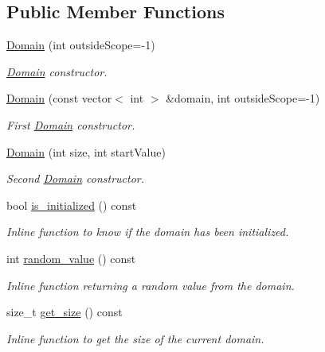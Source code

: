 \subsection*{Public Member Functions}
\begin{DoxyCompactItemize}
\item 
\hyperlink{classghost_1_1Domain_a48bfae90d7dbb6d8e1a3afdd8e471e4f}{Domain} (int outside\-Scope=-\/1)
\begin{DoxyCompactList}\small\item\em \hyperlink{classghost_1_1Domain}{Domain} constructor. \end{DoxyCompactList}\item 
\hyperlink{classghost_1_1Domain_a5277f6bd2940a87b4784834e93cb53c9}{Domain} (const vector$<$ int $>$ \&domain, int outside\-Scope=-\/1)
\begin{DoxyCompactList}\small\item\em First \hyperlink{classghost_1_1Domain}{Domain} constructor. \end{DoxyCompactList}\item 
\hyperlink{classghost_1_1Domain_a6a9f7b0aec78acb0b0f4edefaea7a6e9}{Domain} (int size, int start\-Value)
\begin{DoxyCompactList}\small\item\em Second \hyperlink{classghost_1_1Domain}{Domain} constructor. \end{DoxyCompactList}\item 
bool \hyperlink{classghost_1_1Domain_a3190b9f6968e00831434f8d241991353}{is\-\_\-initialized} () const 
\begin{DoxyCompactList}\small\item\em Inline function to know if the domain has been initialized. \end{DoxyCompactList}\item 
int \hyperlink{classghost_1_1Domain_a5d12f840be7a0ddd673c85d70426a75e}{random\-\_\-value} () const 
\begin{DoxyCompactList}\small\item\em Inline function returning a random value from the domain. \end{DoxyCompactList}\item 
size\-\_\-t \hyperlink{classghost_1_1Domain_a222990a926a5313aef33025d48b41712}{get\-\_\-size} () const 
\begin{DoxyCompactList}\small\item\em Inline function to get the size of the current domain. \end{DoxyCompactList}\item 

\end{DoxyCompactItemize}
